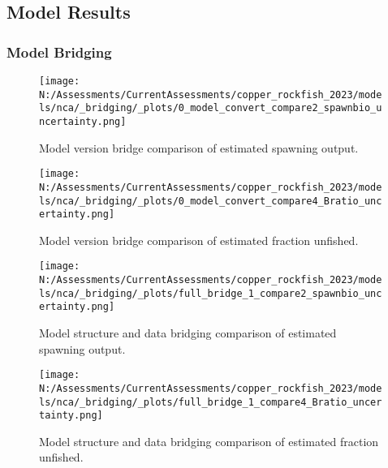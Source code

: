 \documentclass[11pt,
  english,
  letterpaper,
]{article}
\begin{document}
\pagebreak

\hypertarget{model-results}{%
\subsection{Model Results}\label{model-results}}

\hypertarget{model-bridging}{%
\subsubsection{Model Bridging}\label{model-bridging}}

\begin{figure}
\centering
\texttt{[image: N:/Assessments/CurrentAssessments/copper\_rockfish\_2023/models/nca/\_bridging/\_plots/0\_model\_convert\_compare2\_spawnbio\_uncertainty.png]}
\caption{Model version bridge comparison of estimated spawning output.\label{fig:bridge-ssb}}
\end{figure}

\pagebreak

\begin{figure}
\centering
\texttt{[image: N:/Assessments/CurrentAssessments/copper\_rockfish\_2023/models/nca/\_bridging/\_plots/0\_model\_convert\_compare4\_Bratio\_uncertainty.png]}
\caption{Model version bridge comparison of estimated fraction unfished.\label{fig:bridge-depl}}
\end{figure}

\pagebreak

\begin{figure}
\centering
\texttt{[image: N:/Assessments/CurrentAssessments/copper\_rockfish\_2023/models/nca/\_bridging/\_plots/full\_bridge\_1\_compare2\_spawnbio\_uncertainty.png]}
\caption{Model structure and data bridging comparison of estimated spawning output.\label{fig:data-bridge-ssb-1}}
\end{figure}

\pagebreak

\begin{figure}
\centering
\texttt{[image: N:/Assessments/CurrentAssessments/copper\_rockfish\_2023/models/nca/\_bridging/\_plots/full\_bridge\_1\_compare4\_Bratio\_uncertainty.png]}
\caption{Model structure and data bridging comparison of estimated fraction unfished.\label{fig:data-bridge-depl-1}}
\end{figure}

\pagebreak
\end{document}

